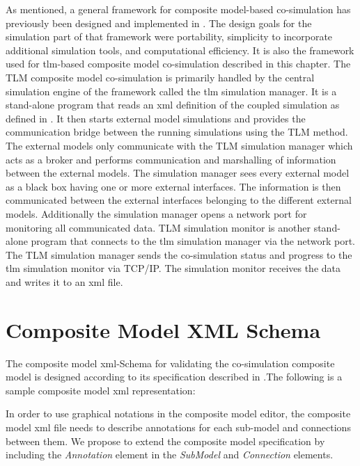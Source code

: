 As men\-tioned, a gen\-eral frame\-work for com\-pos\-ite model-based co-simulation has pre\-vi\-ously 
been de\-signed and im\-ple\-mented in  \cite{tlmalexander05}. The design goals for the simulation part of that framework
were portability, simplicity to incorporate additional simulation tools, and computational efficiency. 
It is also the framework used for \acrshort{tlm}-based composite model co-simulation described in this chapter.
The TLM composite model co-simulation is primarily handled by the central simulation engine of the framework 
called the \acrshort{tlm} simulation manager. It is a stand-alone program that reads an \acrshort{xml} definition
of the coupled simulation as defined in \cite{tlmalexander05}. It then starts external model simulations and
provides the communication bridge between the running simulations using the TLM \cite{tlmlakov06} method. 
The external models only communicate with the TLM simulation manager which acts as a broker and
performs communication and marshalling of information between the external models. The
simulation manager sees every external model as a black box having one or more external interfaces. The
information is then communicated between the external interfaces belonging to the different external models.
Additionally the simulation manager opens a network port for monitoring all communicated data.
TLM simulation monitor is another stand-alone program that connects to the \acrshort{tlm} simulation manager via the network port. 
The TLM simulation manager sends the co-simulation status and progress to the \acrshort{tlm}
simulation monitor via TCP/IP. The simulation monitor receives the data and writes it to an \acrshort{xml} file.

\section{Composite Model XML Schema}
\label{sec:tlmschema}

The composite model \acrshort{xml}-Schema for validating the co-simulation composite model is designed according
to its specification described in \cite{tlmalexander05}.The following is a sample composite model \acrshort{xml} representation:



In order to use graphical notations in the composite model editor, the composite model \acrshort{xml} file needs to describe annotations for each sub-model and connections between them. We propose to extend the composite model specification by including the \textit{Annotation}  element in the \textit{SubModel} and \textit{Connection} elements.

